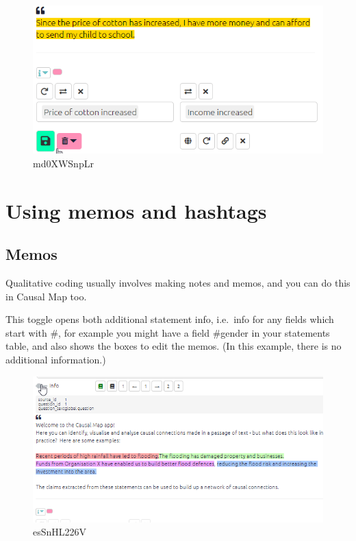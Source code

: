 \documentclass[
]{book}
\begin{document}
\begin{figure}
\centering
\includegraphics[width=6.77083in,height=\textheight]{_assets/md0XWSnpLr.gif}
\caption{md0XWSnpLr}
\end{figure}

\hypertarget{xmemosandhashtags}{%
\section{Using memos and hashtags}\label{xmemosandhashtags}}

\hypertarget{xlink-memos}{%
\subsection{Memos}\label{xlink-memos}}

Qualitative coding usually involves making notes and memos, and you can do this in Causal Map too.

This toggle opens both additional statement info, i.e.~info for any fields which start with \#, for example you might have a field \#gender in your statements table, and also shows the boxes to edit the memos. (In this example, there is no additional information.)

\begin{figure}
\centering
\includegraphics{_assets/esSnHL226V.gif}
\caption{esSnHL226V}
\end{figure}
\end{document}
